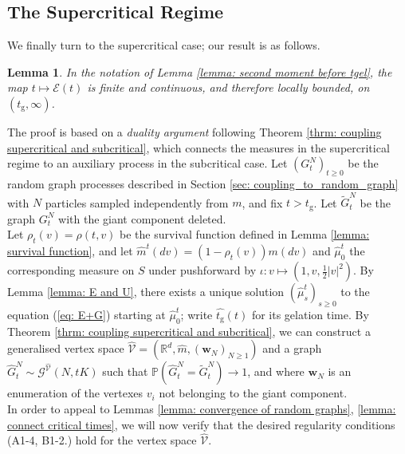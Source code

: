 \documentclass[11pt, notitlepage]{article}
\newtheorem{lem}[thm]{Lemma}
\begin{document}
\subsection{\textbf{The Supercritical Regime}} We finally turn to the supercritical case; our result is as follows. 
\begin{lem}\label{lemma: second moment finite after tgel} In the notation of Lemma \ref{lemma: second moment before tgel}, the map $t\mapsto \mathcal{E}(t)$ is finite and continuous, and therefore locally bounded, on  $(t_\mathrm{g},\infty)$. \end{lem} 
The proof is based on a \emph{duality argument} following Theorem \ref{thrm: coupling supercritical and subcritical}, which connects the measures in the supercritical regime to an auxiliary process in the subcritical case.  Let $(G^N_t)_{t\geq 0}$ be the random graph processes described in Section  \ref{sec: coupling_to_random_graph} with $N$ particles sampled independently from $m$, and fix $t>t_\mathrm{g}$. Let $\widetilde{G}^N_{t}$ be the graph $G^N_{t}$ with the giant component deleted. \medskip \\ 
Let $\rho_{t}(v)=\rho(t, v)$ be the survival function defined in Lemma \ref{lemma: survival function}, and let $\widehat{m}^t(dv)=(1-\rho_{t}(v))m(dv)$ and $\widehat{\mu}^t_0$ the corresponding measure on $S$ under pushforward by $\iota: v\mapsto (1, v, \frac{1}{2}|v|^2)$. By Lemma \ref{lemma: E and U}, there exists a unique solution $(\widehat{\mu}^t_s)_{s\geq 0}$ to the equation (\ref{eq: E+G}) starting at $\widehat{\mu}^t_0$; write $\widehat{t_\mathrm{g}}(t)$ for its gelation time. By Theorem \ref{thrm: coupling supercritical and subcritical}, we can construct a generalised vertex space $\widehat{\mathcal{V}}=(\mathbb{R}^d, \widehat{m}, (\mathbf{w}_N)_{N\ge 1})$ and a graph $\widehat{G}^N_{t}\sim \mathcal{G}^{\widehat{\mathcal{V}}}(N,tK)$ such that $\mathbb{P}(\widehat{G}^N_{t}=\widetilde{G}^N_{t})\rightarrow 1$, and where $\mathbf{w}_N$ is an enumeration of the vertexes $v_i$ not belonging to the giant component. 
\medskip \\
In order to appeal to Lemmas \ref{lemma: convergence of random graphs}, \ref{lemma: connect critical times}, we will now verify that the desired regularity conditions (A1-4, B1-2.) hold for the vertex space $\widehat{\mathcal{V}}$.
\end{document}
